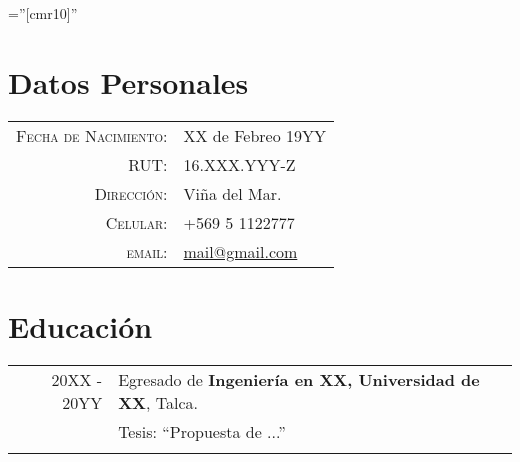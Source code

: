 \documentclass[a4paper,11pt]{article} %
\begin{document}
\pagestyle{empty} %
\font\fb=''[cmr10]'' %

\par{\bigskip\par} %
\section{Datos Personales}
\begin{tabular}{rl}
\textsc{Fecha de Nacimiento:} &	XX de Febreo 19YY \\
\textsc{RUT:} &	16.XXX.YYY-Z \\
\textsc{Dirección:} & Viña del Mar. \\
\textsc{Celular:} & +569 5 1122777\\
\textsc{email:} & \href{mailto:mail@gmail.com}{mail@gmail.com}\\
\end{tabular}

\section{Educación}
\begin{tabular}{r p{11cm}}	
\textsc{20XX - 20YY }& Egresado de \textbf{ Ingeniería en XX, Universidad de XX}, Talca.\\
& Tesis: ``Propuesta de ...''\\
\multicolumn{2}{c}{}
\end{tabular}



\end{document}
